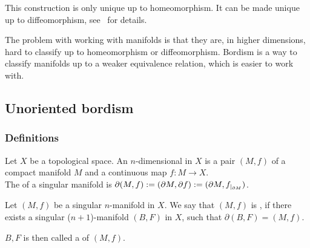 \documentclass[a4paper,11pt]{article}
\begin{document}
\begin{remark}
    This construction is only unique up to homeomorphism. It can be made unique up to diffeomorphism, see\ \cite[VI.1]{kosinski} for details.
\end{remark}



The problem with working with manifolds is that they are, in higher dimensions, hard to classify up to homeomorphism or diffeomorphism. Bordism is a way to classify manifolds up to a weaker equivalence relation, which is easier to work with.

\subsection{Unoriented bordism}
\subsubsection{Definitions}

\begin{definition}\label{singular manifold}
    Let \(X\) be a topological space. An \(n\)-dimensional  in \(X\) is a pair \((M,f)\) of a compact manifold \(M\) and a continuous map \(f:M\to X\).\\
    The  of a singular manifold is \(\partial(M,f):=(\partial M, \partial f):=(\partial M,f_{|_{\partial M}})\).
\end{definition}

\begin{definition}
    Let \((M,f)\) be a singular \(n\)-manifold in \(X\). We say that \((M,f)\) is , if there exists a singular (\(n+1\))-manifold \((B,F)\) in \(X\), such that \(\partial(B,F)=(M,f)\).

    \(B,F\) is then called a  of \((M,f)\).
\end{definition}
\end{document}
